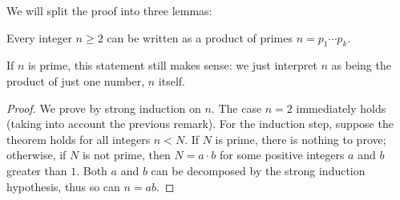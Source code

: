 \documentclass[11pt,dvipsnames]{book}
\numberwithin{equation}{section} %
\numberwithin{figure}{section} %
\numberwithin{table}{section} %
\begin{document}
%
%
%
%
%
%
%



We will split the proof into three lemmas:


\begin{lemma}
Every integer $n\geq 2$ can be written as a product of primes $n=p_{1}\cdots p_{k}$. 
\end{lemma}

\begin{remark}
If $n$ is prime, this statement still makes sense: we just interpret $n$ as being the product of just one number, $n$ itself. 
\end{remark}

\begin{proof}
We prove by strong induction on $n$. The case $n=2$ immediately holds (taking into account the previous remark). For the induction step, suppose the theorem holds for all integers $n<N$.  If $N$ is prime, there is nothing to prove; otherwise, if $N$ is not prime, then $N=a\cdot b$ for some positive integers $a$ and $b$ greater than $1$. Both $a$ and $b$ can be  decomposed by the strong induction hypothesis, thus so can $n=ab$.
\end{proof}
\end{document}
